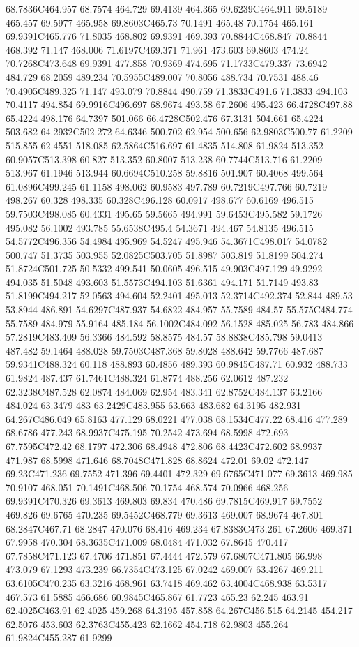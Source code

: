 68.7836C464.957 68.7574 464.729 69.4139 464.365 69.6239C464.911 69.5189 465.457 69.5977 465.958 69.8603C465.73 70.1491 465.48 70.1754 465.161 69.9391C465.776 71.8035 468.802 69.9391 469.393 70.8844C468.847 70.8844 468.392 71.147 468.006 71.6197C469.371 71.961 473.603 69.8603 474.24 70.7268C473.648 69.9391 477.858 70.9369 474.695 71.1733C479.337 73.6942 484.729 68.2059 489.234 70.5955C489.007 70.8056 488.734 70.7531 488.46 70.4905C489.325 71.147 493.079 70.8844 490.759 71.3833C491.6 71.3833 494.103 70.4117 494.854 69.9916C496.697 68.9674 493.58 67.2606 495.423 66.4728C497.88 65.4224 498.176 64.7397 501.066 66.4728C502.476 67.3131 504.661 65.4224 503.682 64.2932C502.272 64.6346 500.702 62.954 500.656 62.9803C500.77 61.2209 515.855 62.4551 518.085 62.5864C516.697 61.4835 514.808 61.9824 513.352 60.9057C513.398 60.827 513.352 60.8007 513.238 60.7744C513.716 61.2209 513.967 61.1946 513.944 60.6694C510.258 59.8816 501.907 60.4068 499.564 61.0896C499.245 61.1158 498.062 60.9583 497.789 60.7219C497.766 60.7219 498.267 60.328 498.335 60.328C496.128 60.0917 498.677 60.6169 496.515 59.7503C498.085 60.4331 495.65 59.5665 494.991 59.6453C495.582 59.1726 495.082 56.1002 493.785 55.6538C495.4 54.3671 494.467 54.8135 496.515 54.5772C496.356 54.4984 495.969 54.5247 495.946 54.3671C498.017 54.0782 500.747 51.3735 503.955 52.0825C503.705 51.8987 503.819 51.8199 504.274 51.8724C501.725 50.5332 499.541 50.0605 496.515 49.903C497.129 49.9292 494.035 51.5048 493.603 51.5573C494.103 51.6361 494.171 51.7149 493.83 51.8199C494.217 52.0563 494.604 52.2401 495.013 52.3714C492.374 52.844 489.53 53.8944 486.891 54.6297C487.937 54.6822 484.957 55.7589 484.57 55.575C484.774 55.7589 484.979 55.9164 485.184 56.1002C484.092 56.1528 485.025 56.783 484.866 57.2819C483.409 56.3366 484.592 58.8575 484.57 58.8838C485.798 59.0413 487.482 59.1464 488.028 59.7503C487.368 59.8028 488.642 59.7766 487.687 59.9341C488.324 60.118 488.893 60.4856 489.393 60.9845C487.71 60.932 488.733 61.9824 487.437 61.7461C488.324 61.8774 488.256 62.0612 487.232 62.3238C487.528 62.0874 484.069 62.954 483.341 62.8752C484.137 63.2166 484.024 63.3479 483 63.2429C483.955 63.663 483.682 64.3195 482.931 64.267C486.049 65.8163 477.129 68.0221 477.038 68.1534C477.22 68.416 477.289 68.6786 477.243 68.9937C475.195 70.2542 473.694 68.5998 472.693 67.7595C472.42 68.1797 472.306 68.4948 472.806 68.4423C472.602 68.9937 471.987 68.5998 471.646 68.7048C471.828 68.8624 472.01 69.02 472.147 69.23C471.236 69.7552 471.396 69.4401 472.329 69.6765C471.077 69.3613 469.985 70.9107 468.051 70.1491C468.506 70.1754 468.574 70.0966 468.256 69.9391C470.326 69.3613 469.803 69.834 470.486 69.7815C469.917 69.7552 469.826 69.6765 470.235 69.5452C468.779 69.3613 469.007 68.9674 467.801 68.2847C467.71 68.2847 470.076 68.416 469.234 67.8383C473.261 67.2606 469.371 67.9958 470.304 68.3635C471.009 68.0484 471.032 67.8645 470.417 67.7858C471.123 67.4706 471.851 67.4444 472.579 67.6807C471.805 66.998 473.079 67.1293 473.239 66.7354C473.125 67.0242 469.007 63.4267 469.211 63.6105C470.235 63.3216 468.961 63.7418 469.462 63.4004C468.938 63.5317 467.573 61.5885 466.686 60.9845C465.867 61.7723 465.23 62.245 463.91 62.4025C463.91 62.4025 459.268 64.3195 457.858 64.267C456.515 64.2145 454.217 62.5076 453.603 62.3763C455.423 62.1662 454.718 62.9803 455.264 61.9824C455.287 61.9299 